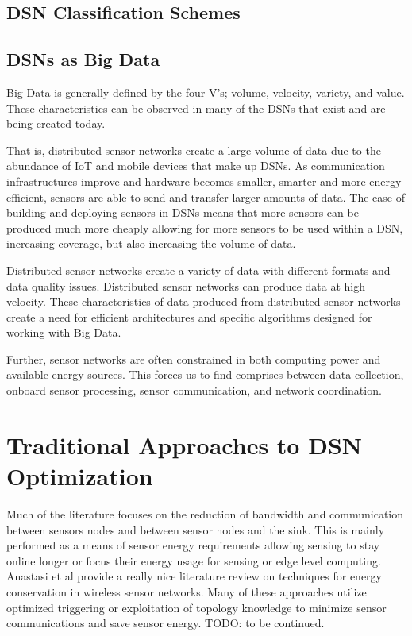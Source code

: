 \subsection{DSN Classification Schemes}

\subsection{DSNs as Big Data}
Big Data is generally defined by the four V's; volume, velocity, variety, and value. These characteristics can be observed in many of the DSNs that exist and are being created today. %

That is, distributed sensor networks create a large volume of data due to the abundance of IoT and mobile devices that make up DSNs. As communication infrastructures improve and hardware becomes smaller, smarter and more energy efficient, sensors are able to send and transfer larger amounts of data. The ease of building and deploying sensors in DSNs means that more sensors can be produced much more cheaply allowing for more sensors to be used within a DSN, increasing coverage, but also increasing the volume of data.

Distributed sensor networks create a variety of data with different formats and data quality issues. Distributed sensor networks can produce data at high velocity. These characteristics of data produced from distributed sensor networks create a need for efficient architectures and specific algorithms designed for working with Big Data.

Further, sensor networks are often constrained in both computing power and available energy sources. This forces us to find comprises between data collection, onboard sensor processing, sensor communication, and network coordination.

\section{Traditional Approaches to DSN Optimization}
Much of the literature focuses on the reduction of bandwidth and communication between sensors nodes and between sensor nodes and the sink. This is mainly performed as a means of sensor energy requirements allowing sensing to stay online longer or focus their energy usage for sensing or edge level computing. Anastasi et al\cite{anastasi_energy_2009} provide a really nice literature review on techniques for energy conservation in wireless sensor networks. Many of these approaches utilize optimized triggering\cite{alippi_adaptive_2010} or exploitation of topology knowledge\cite{warrier2007much} to minimize sensor communications and save sensor energy. TODO: to be continued.	

